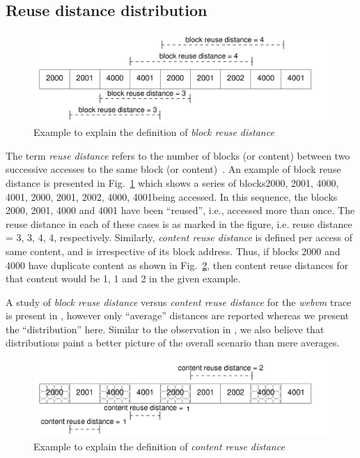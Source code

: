 \subsection{Reuse distance distribution}

\begin{figure}
	\centering
	\includegraphics[scale=0.6]{tracechar-figures/21-day/reusedist-example.pdf}
	\caption{Example to explain the definition of \textit{block reuse distance}}
	\label{fig:reusedist-example}
\end{figure}

The term \textit{reuse distance} refers to the number of blocks (or content)
between two successive accesses to the same block (or content)~\cite{iodedup}. 
An example of block reuse distance is
presented in Fig.~\ref{fig:reusedist-example} which shows a series
of blocks\textemdash{}2000, 2001, 4000, 4001, 2000, 2001, 2002, 4000, 4001\textemdash{}being
accessed. In this sequence, the blocks 2000, 2001, 4000 and 4001 have
been ``reused'', i.e., accessed more than once. The reuse distance in
each of these cases is as marked in the figure, i.e. reuse distance
= 3, 3, 4, 4, respectively. Similarly, \textit{content reuse distance}
is defined per access of same content, and is irrespective of its block 
address. Thus, if blocks 2000 and 4000 have duplicate content as shown
in Fig.~\ref{fig:content-reusedist-example}, then content reuse distances
for that content would be 1, 1 and 2 in the given example.

A study of \textit{block reuse distance} versus \textit{content reuse distance}
for the \textit{webvm} trace is present in \cite{iodedup}, however only
``average'' distances are reported whereas we present the ``distribution'' here.
Similar to the observation in \cite{commercial-characterization}, we also
believe that distributions paint a better picture of the overall scenario
than mere averages.


\begin{figure}
	\centering
	\includegraphics[scale=0.6]{tracechar-figures/21-day/content-reusedist-example-fixedmanual-2.pdf}
	\caption{Example to explain the definition of \textit{content reuse distance}}
	\label{fig:content-reusedist-example}
\end{figure}

